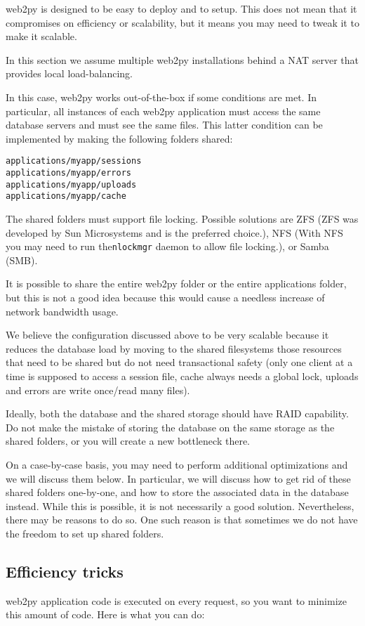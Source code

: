 \documentclass[justified,sixbynine,notoc]{tufte-book}
\def\ft{\small\tt}
\def\inxx#1{\index{#1}}
\begin{document}
\begin{fullwidth}
\inxx{scalability}
\noindent web2py is designed to be easy to deploy and to setup. This does not mean that it compromises on efficiency or scalability, but it means you may need to tweak it to make it scalable.

In this section we assume multiple web2py installations behind a NAT server that provides local load-balancing.

In this case, web2py works out-of-the-box if some conditions are met. In particular, all instances of each web2py application must access the same database servers and must see the same files. This latter condition can be implemented by making the following folders shared:
\begin{lstlisting}
applications/myapp/sessions
applications/myapp/errors
applications/myapp/uploads
applications/myapp/cache
\end{lstlisting}

The shared folders must support file locking. Possible solutions are ZFS
(ZFS was developed by Sun Microsystems and is the preferred choice.), NFS
(With NFS you may need to run the{\ft nlockmgr} daemon to allow file locking.), or Samba (SMB).

It is possible to share the entire web2py folder or the entire applications folder, but this is not a good idea because this would cause a needless increase of network bandwidth usage.

We believe the configuration discussed above to be very scalable because it reduces the database load by moving to the shared filesystems those resources that need to be shared but do not need transactional safety (only one client at a time is supposed to access a session file, cache always needs a global lock, uploads and errors are write once/read many files).

Ideally, both the database and the shared storage should have RAID capability. Do not make the mistake of storing the database on the same storage as the shared folders, or you will create a new bottleneck there.

On a case-by-case basis, you may need to perform additional optimizations and we will discuss them below. In particular, we will discuss how to get rid of these shared folders one-by-one, and how to store the associated data in the database instead. While this is possible, it is not necessarily a good solution. Nevertheless, there may be reasons to do so. One such reason is that sometimes we do not have the freedom to set up shared folders.

\goodbreak\subsection{Efficiency tricks}
\noindent web2py application code is executed on every request, so you want to minimize this amount of code. Here is what you can do:


\end{fullwidth}
\end{document}
